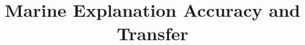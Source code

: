 \documentclass[conference]{IEEEtran}
\begin{document}
\title{Marine Explanation Accuracy and Transfer}
\maketitle



\end{document}
